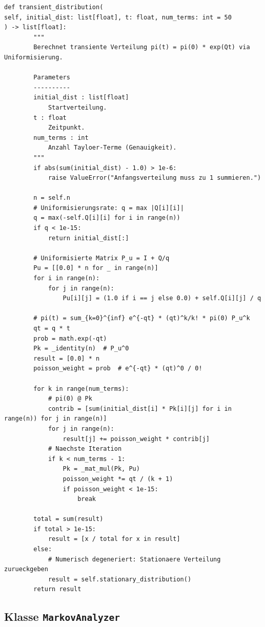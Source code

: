 ﻿\documentclass[a4paper,12pt]{report}
\theoremstyle{definition}
\begin{document}
\begin{lstlisting}[style=python, caption={Uniformisierungsverfahren fÃ¼r die transiente Verteilung (Auszug)}, label=lst:uniformization]
def transient_distribution(
self, initial_dist: list[float], t: float, num_terms: int = 50
) -> list[float]:
        """
        Berechnet transiente Verteilung pi(t) = pi(0) * exp(Qt) via Uniformisierung.

        Parameters
        ----------
        initial_dist : list[float]
            Startverteilung.
        t : float
            Zeitpunkt.
        num_terms : int
            Anzahl Tayloer-Terme (Genauigkeit).
        """
        if abs(sum(initial_dist) - 1.0) > 1e-6:
            raise ValueError("Anfangsverteilung muss zu 1 summieren.")

        n = self.n
        # Uniformisierungsrate: q = max |Q[i][i]|
        q = max(-self.Q[i][i] for i in range(n))
        if q < 1e-15:
            return initial_dist[:]

        # Uniformisierte Matrix P_u = I + Q/q
        Pu = [[0.0] * n for _ in range(n)]
        for i in range(n):
            for j in range(n):
                Pu[i][j] = (1.0 if i == j else 0.0) + self.Q[i][j] / q

        # pi(t) = sum_{k=0}^{inf} e^{-qt} * (qt)^k/k! * pi(0) P_u^k
        qt = q * t
        prob = math.exp(-qt)
        Pk = _identity(n)  # P_u^0
        result = [0.0] * n
        poisson_weight = prob  # e^{-qt} * (qt)^0 / 0!

        for k in range(num_terms):
            # pi(0) @ Pk
            contrib = [sum(initial_dist[i] * Pk[i][j] for i in range(n)) for j in range(n)]
            for j in range(n):
                result[j] += poisson_weight * contrib[j]
            # Naechste Iteration
            if k < num_terms - 1:
                Pk = _mat_mul(Pk, Pu)
                poisson_weight *= qt / (k + 1)
                if poisson_weight < 1e-15:
                    break

        total = sum(result)
        if total > 1e-15:
            result = [x / total for x in result]
        else:
            # Numerisch degeneriert: Stationaere Verteilung zurueckgeben
            result = self.stationary_distribution()
        return result
\end{lstlisting}

\subsection{Klasse \texttt{MarkovAnalyzer}}
\end{document}
